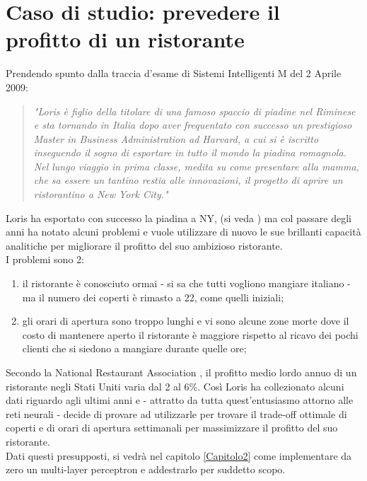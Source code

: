 \section{Caso di studio: prevedere il profitto di un ristorante}
Prendendo spunto dalla traccia d'esame di Sistemi Intelligenti M del 2 Aprile 2009:
\begin{quote}
\textit{"Loris è figlio della titolare di una famoso spaccio di piadine nel Riminese e sta tornando in Italia
dopo aver frequentato con successo un prestigioso Master in Business Administration ad Harvard, a
cui si è iscritto inseguendo il sogno di esportare in tutto il mondo la piadina romagnola. Nel lungo
viaggio in prima classe, medita su come presentare alla mamma, che sa essere un tantino restia alle
innovazioni, il progetto di aprire un ristorantino a New York City."}
\end{quote}
Loris ha esportato con successo la piadina a NY, (si veda \parencite{WGradisca}) ma col passare degli anni ha notato alcuni problemi e vuole utilizzare di nuovo le sue brillanti capacità analitiche per migliorare il profitto del suo ambizioso ristorante. \\
I problemi sono 2: 
\begin{enumerate}
\item il ristorante è conosciuto ormai - si sa che tutti vogliono mangiare italiano - ma il numero dei coperti è rimasto a 22, come quelli iniziali; 
\item gli orari di apertura sono troppo lunghi e vi sono alcune zone morte dove il costo di mantenere aperto il ristorante è maggiore rispetto al ricavo dei pochi clienti che si siedono a mangiare durante quelle ore; 
\end{enumerate}
Secondo la National Restaurant Association \parencite{WProfit} \parencite{WRRG}, il profitto medio lordo annuo di un ristorante negli Stati Uniti varia dal 2 al 6\%. Così Loris ha collezionato alcuni dati riguardo agli ultimi anni e - attratto da tutta quest'entusiasmo attorno alle reti neurali - decide di provare ad utilizzarle per trovare il trade-off ottimale di coperti e di orari di apertura settimanali per massimizzare il profitto del suo ristorante. 
\\

Dati questi presupposti, si vedrà nel capitolo \ref{Capitolo2} come implementare da zero un multi-layer perceptron e addestrarlo per suddetto scopo.

